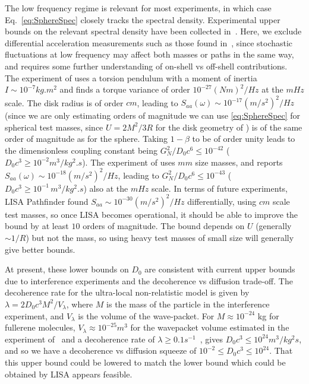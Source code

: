 \documentclass[aps,pra,amsmath,amssymb,amsthm,floatfix,nofootinbib,notitlepage,superscriptaddress,10pt]{revtex4-2}
\begin{document}
The low frequency regime is relevant for most experiments, in which case Eq.~\eqref{eq:SphereSpec} closely tracks the spectral density. 
Experimental upper bounds on the relevant spectral density have been collected in~\cite{Carney_2021,janse2024current}. Here, we exclude differential acceleration measurements such as those found in~\cite{asenbaum2017phase,armano2018beyond}, since stochastic fluctuations at low frequency may affect both masses or paths in the same way, and requires some further understanding of on-shell vs off-shell contributions.
The experiment of \cite{hoyle2004submillimeter} uses a torsion pendulum with a moment of inertia $I\sim 10^{-7} \unit{kg.m^2}$ and finds a torque variance of order $10^{-27}\unit{(Nm)^2/Hz}$ at the $\unit{mHz}$ 
scale. The disk radius is of order $\unit{cm}$, leading to $S_{aa}(\omega)\sim 10^{-17}\unit{(m/s^2)^2/Hz}$ (since we are only estimating orders of magnitude we can use \eqref{eq:SphereSpec} for spherical test masses, since  $U=2M^2/3R$ for the disk 
geometry of \cite{hoyle2004submillimeter}) is of the same order of magnitude as for the sphere. Taking $1-\beta$ to be of order unity leads to the dimensionless coupling constant being $G_N^2/
D_0c^6\leq 10^{-42}$ ($D_0c^3\geq 10^{-2} \unit{ m^3/kg^2.s}$). The experiment of \cite{westphal2020measurement} uses $\unit{mm}$ 
size masses, and reports $S_{aa}(\omega)\sim 10^{-18}\unit{(m/s^2)^2/Hz}$, leading to 
$G_N^2/D_0c^6\leq 10^{-43}$ ($D_0 c^3\geq 10^{-1}\, \unit{m^3/kg^2.s}$) also at the $\unit{mHz}$ scale. 
In terms of future experiments, LISA Pathfinder found $S_{aa}\sim 10^{-30}\unit{(m/s^2)^2/Hz}$ differentially, using $\unit{cm}$ scale test masses, so once LISA becomes operational, it should be able to improve the bound by at least $10$ orders of magnitude. The bound depends on $U$ (generally $\sim 1/R$) but not the mass, so using heavy test masses of small size will generally give better bounds.


At present, these lower bounds on $D_0$ are consistent with current upper bounds due to interference experiments and the decoherence vs diffusion trade-off.   
The decoherence rate for the ultra-local non-relatistic model is given by~\cite{oppenheim2023gravitationally} $\lambda=2D_{0}c^3M^2/V_\lambda$, where $M$ is the mass of the particle in the interference experiment, and $V_\lambda$ is the volume of the wave-packet. For $M\approx 10^{-24}$ kg for fullerene molecules, $V_\lambda\approx 10^{-25}\unit{m^3}$ for the wavepacket volume estimated in the experiment of~\cite{Gerlich2011} and a decoherence rate of  $\lambda\geq 0.1 \unit{s^{-1}}$~\cite{Gerlich2011},
gives $D_0c^3\leq 10^{24} \unit{m^3/kg^2 s}$, and so we have a decoherence vs diffusion squeeze of
$10^{-2}\leq D_0c^3\leq 10^{24} $. That this upper bound could be lowered to match the lower bound which could be obtained by LISA appears feasible.
\end{document}
